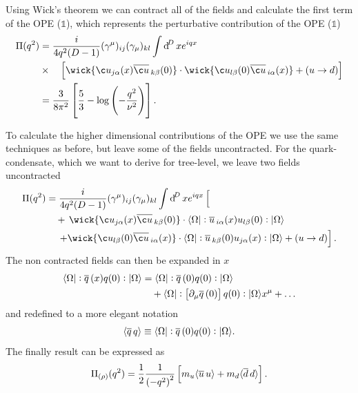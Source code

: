 \documentclass[../../index.tex]{subfiles}
\begin{document}
Using Wick's theorem we can contract all of the fields and calculate the first
term of the OPE ($\mathbb{1}$), which represents the perturbative contribution
of the OPE ($\mathbb{1}$)
\begin{equation}
  \begin{split}
    \Pi(q^2) &= \frac{i}{4q^2(D-1)} (\gamma^\mu)_{ij} (\gamma_\mu)_{kl} \int \dif^D x e^{iqx} \\
    &\times\quad\left[ \wick{ \c u_{j \alpha}(x) \anti{\c u}_{k \beta}(0)} \cdot
      \wick{\c u_{l \beta}(0) \anti{\c u}_{i \alpha}(x)} + (u \to d)
    \right] \\
    &= \frac{3}{8\pi^2} \left[ \frac{5}{3} - \log\left( -\frac{q^2}{\nu^2}
      \right) \right].
  \end{split}
\end{equation}

To calculate the higher dimensional contributions of the OPE we use the same
techniques as before, but leave some of the fields uncontracted. For the
quark-condensate, which we want to derive for tree-level, we leave two fields
uncontracted
\begin{equation}
  \begin{split}
    \Pi(q^2) &= \frac{i}{4q^2(D-1)} (\gamma^\mu)_{ij} (\gamma_\mu)_{kl} \int \dif^D x e^{iqx} \left[ \phantom{\wick{ \c u_{j \alpha}(x) \anti{\c u}_{k \beta}(0)}} \right.\\
    &\quad+\,\wick{ \c u_{j \alpha}(x) \anti{\c u}_{k \beta}(0)} \cdot \langle \Omega \vert : \anti{u}_{i \alpha}(x) u_{l \beta} (0) :\vert \Omega \rangle \\
    &\quad\,\left.+\wick{\c u_{l \beta}(0) \anti{\c u}_{i \alpha}(x)} \cdot
      \langle \Omega \vert: \anti{u}_{k \beta}(0) u_{j \alpha}(x) : \vert \Omega
      \rangle + (u \to d) \right].
  \end{split}
\end{equation}
The non contracted fields can then be expanded in $x$
\begin{equation}
  \begin{split}
    \langle \Omega \vert: \overline{q}\,(x) q(0):\vert \Omega \rangle &= \langle\Omega\vert: \overline{q}\,(0) q(0): \vert\Omega\rangle\\
    &\quad+ \langle\Omega\vert:\left[ \partial_\mu \overline{q}\,(0) \right]
    q(0):\vert\Omega\rangle x^\mu + \dots
  \end{split}
\end{equation}
and redefined to a more elegant notation
\begin{equation}
  \langle \overline{q}\,q \rangle \equiv \langle\Omega\vert: \overline{q}\,(0) q(0):\vert\Omega\rangle.
\end{equation}
The finally result can be expressed as 
\begin{equation}
  \Pi_{(\rho)}(q^2) = \frac{1}{2} \frac{1}{\left(-q^2\right)^2} \left[ m_u\langle \overline{u}\, u \rangle + m_d \langle \overline{d}\, d \rangle\right].
\end{equation}
\end{document}
